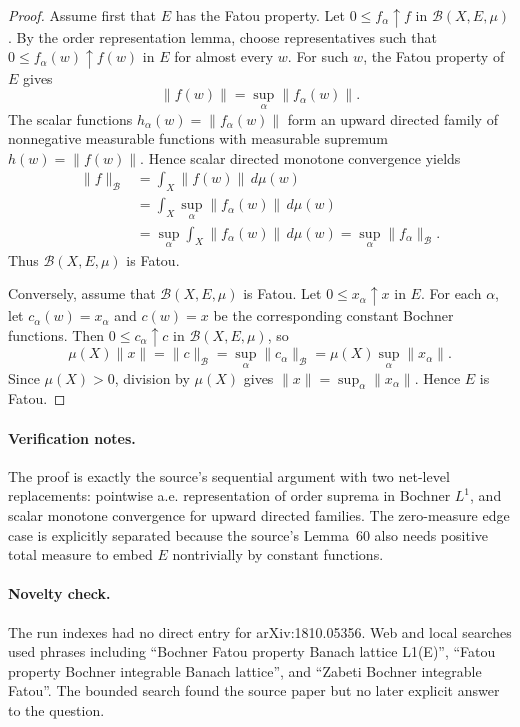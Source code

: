 \documentclass[11pt]{article}
\newcommand{\B}{\mathcal B}
\begin{document}
\begin{proof}
Assume first that $E$ has the Fatou property.  Let
$0\leq f_\alpha\uparrow f$ in $\B(X,E,\mu)$.  By the order representation
lemma, choose representatives such that
$0\leq f_\alpha(w)\uparrow f(w)$ in $E$ for almost every $w$.  For such $w$,
the Fatou property of $E$ gives
\[
  \|f(w)\|=\sup_\alpha \|f_\alpha(w)\|.
\]
The scalar functions $h_\alpha(w)=\|f_\alpha(w)\|$ form an upward directed
family of nonnegative measurable functions with measurable supremum
$h(w)=\|f(w)\|$.  Hence scalar directed monotone convergence yields
\[
\begin{aligned}
  \|f\|_{\B}
  &= \int_X \|f(w)\|\,d\mu(w) \\
  &= \int_X \sup_\alpha \|f_\alpha(w)\|\,d\mu(w) \\
  &= \sup_\alpha \int_X \|f_\alpha(w)\|\,d\mu(w)
   = \sup_\alpha \|f_\alpha\|_{\B}.
\end{aligned}
\]
Thus $\B(X,E,\mu)$ is Fatou.

Conversely, assume that $\B(X,E,\mu)$ is Fatou.  Let
$0\leq x_\alpha\uparrow x$ in $E$.  For each $\alpha$, let
$c_\alpha(w)=x_\alpha$ and $c(w)=x$ be the corresponding constant Bochner
functions.  Then $0\leq c_\alpha\uparrow c$ in $\B(X,E,\mu)$, so
\[
  \mu(X)\|x\|=\|c\|_{\B}
  =\sup_\alpha \|c_\alpha\|_{\B}
  =\mu(X)\sup_\alpha\|x_\alpha\|.
\]
Since $\mu(X)>0$, division by $\mu(X)$ gives
$\|x\|=\sup_\alpha\|x_\alpha\|$.  Hence $E$ is Fatou.
\end{proof}

\paragraph{Verification notes.}
The proof is exactly the source's sequential argument with two net-level
replacements: pointwise a.e. representation of order suprema in Bochner
$L^1$, and scalar monotone convergence for upward directed families.  The
zero-measure edge case is explicitly separated because the source's Lemma~60
also needs positive total measure to embed $E$ nontrivially by constant
functions.

\paragraph{Novelty check.}
The run indexes had no direct entry for arXiv:1810.05356.  Web and local
searches used phrases including ``Bochner Fatou property Banach lattice
L1(E)'', ``Fatou property Bochner integrable Banach lattice'', and
``Zabeti Bochner integrable Fatou''.  The bounded search found the source
paper but no later explicit answer to the question.
\end{document}
